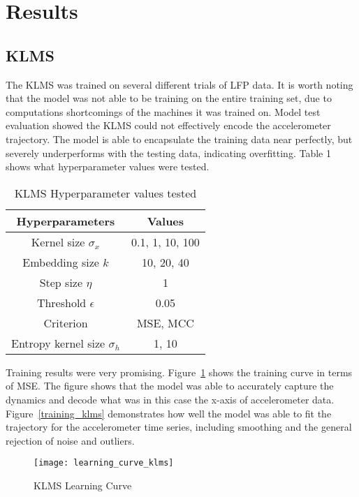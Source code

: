 \documentclass[12pt]{article}
\begin{document}
\section{Results}

\subsection{KLMS}

The KLMS was trained on several different trials of LFP data. It is worth noting that the model was not able to be training on the entire training set, due to computations shortcomings of the machines it was trained on. Model test evaluation showed the KLMS could not effectively encode the accelerometer trajectory. The model is able to encapsulate the training data near perfectly, but severely underperforms with the testing data, indicating overfitting. Table 1 shows what hyperparameter values were tested.

\begin{table}[h!]
    \begin{center}
    \begin{tabular}{ |c|c| } 
    \hline
        Hyperparameters & Values\\ 
    \hline
        Kernel size $\sigma_x$ & 0.1, 1, 10, 100 \\ 
        Embedding size $k$ & 10, 20, 40\\
        Step size $\eta$ & 1 \\
        Threshold $\epsilon$ & 0.05\\
        Criterion & MSE, MCC\\
        Entropy kernel size $\sigma_h$ & 1, 10\\
    \hline
    \end{tabular}
    \end{center}
    \caption{KLMS Hyperparameter values tested}
    \label{table:1}
\end{table}

Training results were very promising. Figure~\ref{learning_curve_klms} shows the training curve in terms of MSE. The figure shows that the model was able to accurately capture the dynamics and decode what was in this case the x-axis of accelerometer data. Figure~\ref{training_klms} demonstrates how well the model was able to fit the trajectory for the accelerometer time series, including smoothing and the general rejection of noise and outliers.

\begin{figure}[h]
\caption{KLMS Learning Curve}
\centering
\texttt{[image: learning\_curve\_klms]}
\label{learning_curve_klms}
\end{figure}
\end{document}
